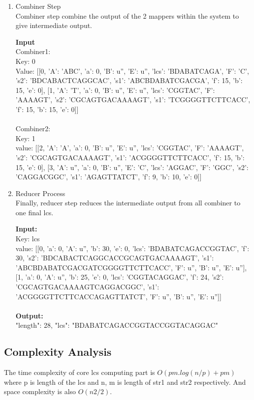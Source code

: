 \documentclass[journal,twoside]{IEEEtran}
\begin{document}
\begin{enumerate}
\item Combiner Step\\
Combiner step combine the output of the 2 mappers within the system to give intermediate output.

\textbf{Input}\\
Combiner1: \\
Key: 0  \\
Value: [[0, {'A': 'ABC', 'a': 0, 'B': u'', 'E': u'', 'lcs': 'BDABATCAGA', 'F': 'C', 's2': 'BDCABACTCAGGCAC', 's1': 'ABCBDABATCGACGA', 'f': 15, 'b': 15, 'e': 0}], [1, {'A': 'T', 'a': 0, 'B': u'', 'E': u'', 'lcs': 'CGGTAC', 'F': 'AAAAGT', 's2': 'CGCAGTGACAAAAGT', 's1': 'TCGGGGTTCTTCACC', 'f': 15, 'b': 15, 'e': 0}]]\\ \\
Combiner2: \\
Key: 1  \\
value:  [[2, {'A': 'A', 'a': 0, 'B': u'', 'E': u'', 'lcs': 'CGGTAC', 'F': 'AAAAGT', 's2': 'CGCAGTGACAAAAGT', 's1': 'ACGGGGTTCTTCACC', 'f': 15, 'b': 15, 'e': 0}], [3, {'A': u'', 'a': 0, 'B': u'', 'E': 'C', 'lcs': 'AGGAC', 'F': 'GGC', 's2': 'CAGGACGGC', 's1': 'AGAGTTATCT', 'f': 9, 'b': 10, 'e': 0}]]\\

\item Reducer Process\\
Finally, reducer step reduces the intermediate output from all combiner to one final lcs. 

\textbf{Input:}\\
Key:  lcs  \\
value:  [[0, {'a': 0, 'A': u'', 'b': 30, 'e': 0, 'lcs': 'BDABATCAGACCGGTAC', 'f': 30, 's2': 'BDCABACTCAGGCACCGCAGTGACAAAAGT', 's1': 'ABCBDABATCGACGATCGGGGTTCTTCACC', 'F': u'', 'B': u'', 'E': u''}], [1, {'a': 0, 'A': u'', 'b': 25, 'e': 0, 'lcs': 'CGGTACAGGAC', 'f': 24, 's2': 'CGCAGTGACAAAAGTCAGGACGGC', 's1': 'ACGGGGTTCTTCACCAGAGTTATCT', 'F': u'', 'B': u'', 'E': u''}]]\\ \\
\textbf{Output:}\\
{"length": 28, "lcs": "BDABATCAGACCGGTACCGGTACAGGAC"}\\
\end{enumerate}


\subsection{Complexity Analysis}
The time complexity of core lcs computing part is  $O(pm.log(n/p)+pm)$ where p is length of the lcs and n, m is length of str1 and str2 respectively. And space complexity is also $O(n2/2)$.
\\
\end{document}
